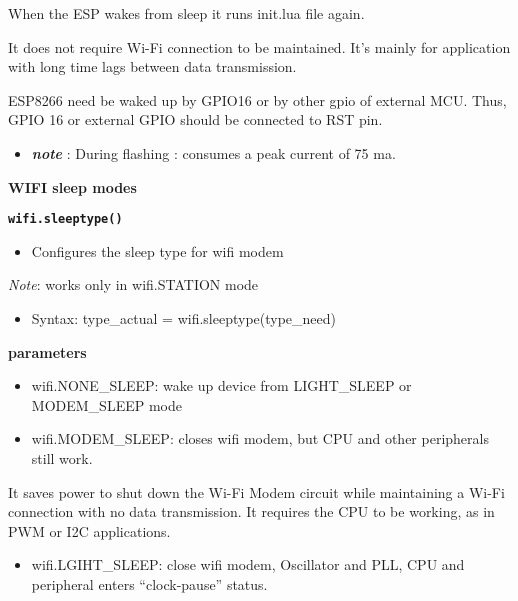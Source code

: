 \documentclass[16pt]{article}
\begin{document}
When the ESP wakes from sleep it runs init.lua file again.

It does not require Wi-Fi connection to be maintained. It's mainly for
application with long time lags between data transmission.

ESP8266 need be waked up by GPIO16 or by other gpio of external MCU.
Thus, GPIO 16 or external GPIO should be connected to RST pin.

\begin{itemize}

\item
  \textbf{\emph{note}} : During flashing : consumes a peak current of 75
  ma.
\end{itemize}

{\Large{\textbf{WIFI sleep modes}}}

\textbf{\texttt{wifi.sleeptype()}}

\begin{itemize}

\item
  Configures the sleep type for wifi modem
\end{itemize}

\emph{Note}: works only in wifi.STATION mode

\begin{itemize}

\item
  Syntax: type\_actual = wifi.sleeptype(type\_need)
\end{itemize}

\textbf{parameters}

\begin{itemize}
\item
  wifi.NONE\_SLEEP: wake up device from LIGHT\_SLEEP or MODEM\_SLEEP
  mode
\item
  wifi.MODEM\_SLEEP: closes wifi modem, but CPU and other peripherals
  still work.
\end{itemize}

It saves power to shut down the Wi-Fi Modem circuit while maintaining a
Wi-Fi connection with no data transmission. It requires the CPU to be
working, as in PWM or I2C applications.

\begin{itemize}

\item
  wifi.LGIHT\_SLEEP: close wifi modem, Oscillator and PLL, CPU and
  peripheral enters ``clock-pause'' status.
\end{itemize}
\end{document}
